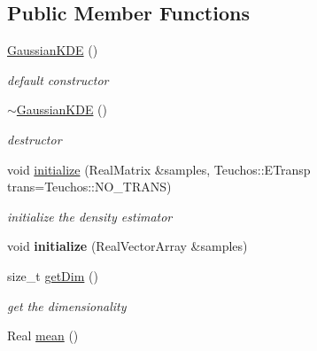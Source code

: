 \subsection*{Public Member Functions}
\begin{DoxyCompactItemize}
\item 
\hyperlink{classPecos_1_1GaussianKDE_a9c2a04bf8270c1ffa8dae1f04cc80b61}{Gaussian\+K\+DE} ()\label{classPecos_1_1GaussianKDE_a9c2a04bf8270c1ffa8dae1f04cc80b61}

\begin{DoxyCompactList}\small\item\em default constructor \end{DoxyCompactList}\item 
\hyperlink{classPecos_1_1GaussianKDE_a976d463a5f7d52ad04814a44228a0751}{$\sim$\+Gaussian\+K\+DE} ()\label{classPecos_1_1GaussianKDE_a976d463a5f7d52ad04814a44228a0751}

\begin{DoxyCompactList}\small\item\em destructor \end{DoxyCompactList}\item 
void \hyperlink{classPecos_1_1GaussianKDE_a6c7e188a789efc33dbeb356f6e200c33}{initialize} (Real\+Matrix \&samples, Teuchos\+::\+E\+Transp trans=Teuchos\+::\+N\+O\+\_\+\+T\+R\+A\+NS)\label{classPecos_1_1GaussianKDE_a6c7e188a789efc33dbeb356f6e200c33}

\begin{DoxyCompactList}\small\item\em initialize the density estimator \end{DoxyCompactList}\item 
void {\bfseries initialize} (Real\+Vector\+Array \&samples)\label{classPecos_1_1GaussianKDE_a50fd0e9c6addf748bf7ae040ec0d91f9}

\item 
size\+\_\+t \hyperlink{classPecos_1_1GaussianKDE_a890ccac161f0becd266252b4cd3b9584}{get\+Dim} ()\label{classPecos_1_1GaussianKDE_a890ccac161f0becd266252b4cd3b9584}

\begin{DoxyCompactList}\small\item\em get the dimensionality \end{DoxyCompactList}\item 
Real \hyperlink{classPecos_1_1GaussianKDE_adc6f262952d05a33ff68cae37929cbb2}{mean} ()\label{classPecos_1_1GaussianKDE_adc6f262952d05a33ff68cae37929cbb2}


\end{DoxyCompactItemize}
